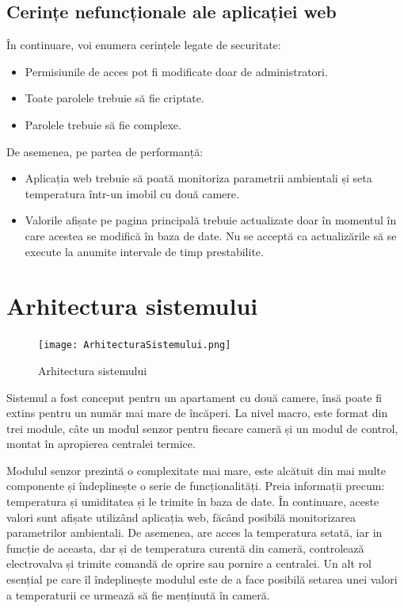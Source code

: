 \subsection{Cerințe nefuncționale ale aplicației web}

	În continuare, voi enumera cerințele legate de securitate:
	\begin{itemize}
		\setlength{\itemindent}{2em}
		\itemsep0em
		\item Permisiunile de acces pot fi modificate doar de administratori.
		\item Toate parolele trebuie să fie criptate.
		\item Parolele trebuie să fie complexe. 
	\end{itemize} 

\vspace{1em}

	De asemenea, pe partea de performanță:
	\begin{itemize}
		\setlength{\itemindent}{2em}
		\itemsep0em
		\item Aplicația web trebuie să poată monitoriza parametrii ambientali și seta temperatura într-un imobil cu două camere.
		\item Valorile afișate pe pagina principală trebuie actualizate doar în momentul în care acestea se modifică în baza de date. Nu se acceptă ca actualizările să se execute la anumite intervale de timp prestabilite. 
	\end{itemize} 
 

\section{Arhitectura sistemului}

\begin{figure}[H]
   	\centering
    	\texttt{[image: ArhitecturaSistemului.png]}
	\caption{Arhitectura sistemului}
\end{figure}

	Sistemul a fost conceput pentru un apartament cu două camere, însă poate fi extins pentru un număr mai mare de încăperi. La nivel macro, este format din trei module, câte un modul senzor pentru fiecare cameră și un modul de control, montat în apropierea centralei termice.

	Modulul senzor prezintă o complexitate mai mare, este alcătuit din mai multe componente și îndeplinește o serie de funcționalități. Preia informații precum: temperatura și umiditatea și le trimite în baza de date. În continuare, aceste valori sunt afișate utilizând aplicația web, făcând posibilă monitorizarea parametrilor ambientali. De asemenea, are acces la temperatura setată, iar in funcție de aceasta, dar și de temperatura curentă din cameră, controlează electrovalva și trimite comandă de oprire sau pornire a centralei. Un alt rol esențial pe care îl îndeplinește modulul este de a face posibilă setarea unei valori a temperaturii ce urmează să fie menținută în cameră.

